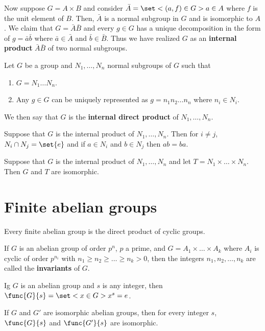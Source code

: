 Now suppose \(G = A \times B\) and consider \(\bar{A} = \set<(a,f) \in G>{a \in A}\) where \(f\) is the unit element of \(B\). Then, \(\bar{A}\) is a normal subgroup in \(G\) and is isomorphic to \(A\). We claim that \(G = \bar{A}\bar{B}\) and every \(g \in G\) has a unique decomposition in the form of \(g = \bar{a}\bar{b}\) where \(\bar{a} \in \bar{A}\) and \(\bar{b} \in \bar{B}\). Thus we have realized \(G\) as an \textbf{internal product} \(\bar{A}\bar{B}\) of two normal subgroups.

\begin{definition}
    Let \(G\) be a group and \(N_1, \dots , N_n\) normal subgroups of \(G\) such that 
    \begin{enumerate}
        \item \(G = N_1 \dots N_n\).
        \item Any \(g \in G\) can be uniquely represented as \(g = n_1n_2 \dots n_n\) where \(n_i \in N_i\).
    \end{enumerate}
    We then say that \(G\) is the \textbf{internal direct product} of \(N_1, \dots, N_n\).
\end{definition}

\begin{lemma}
    Suppose that \(G\) is the internal product of \(N_1, \dots , N_n\). Then for \(i \neq j\), \(N_i \cap N_j = \set{e}\) and if \(a \in N_i\) and \(b \in N_j\) then \(ab = ba\).
\end{lemma}

\begin{theorem}
    Suppose that \(G\) is the internal product of \(N_1, \dots , N_n\) and let \(T = N_1 \times \dots \times N_n\). Then \(G\) and \(T\) are isomorphic.
\end{theorem}
\section{Finite abelian groups}

\begin{theorem}
    Every finite abelian group is the direct product of cyclic groups.
\end{theorem}

\begin{definition}
    If \(G\) is an abelian group of order \(p^n\), \(p\) a prime, and \(G = A_1 \times \dots \times A_k\) where \(A_i\) is cyclic of order \(p^{n_i}\) with \(n_1 \geq n_2 \geq \dots \geq n_k > 0\), then the integers \(n_1,n_2, \dots ,n_k\) are called the \textbf{invariants} of \(G\).
\end{definition}

\begin{definition}
    Ig \(G\) is an abelian group and \(s\) is any integer, then \(\func{G}{s} = \set<x \in G>{x^s = e}\).
\end{definition}

\begin{lemma}
    If \(G\) and \(G'\) are isomorphic abelian groups, then for every integer \(s\), \(\func{G}{s}\) and \(\func{G'}{s}\) are isomorphic.
\end{lemma}